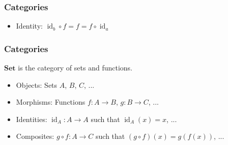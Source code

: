 \documentclass{beamer}
\DeclareMathOperator{\id}{id}
\newcommand{\idO}[1]{\natO{\id}{#1}}
\newcommand{\comp}{\ensuremath{\mathrel{\circ}}}
\newcommand{\catbf}[1]{\ensuremath{\mathbf{#1}}\xspace}
\newcommand{\set}{\catbf{Set}}
\newcommand{\nat}[1]{\ensuremath{#1}}
\newcommand{\natO}[2]{\ensuremath{\nat{#1}_{#2}}}
\begin{document}

\begin{frame}
  \frametitle{Categories}

  \begin{definition}[Category]
    \begin{itemize}
    \item
      Identity: $\idO{b} \comp f = f = f \comp \idO{a}$
    \end{itemize}
  \end{definition}
  \begin{center}
  \end{center}

\end{frame}


\begin{frame}[label={ex:set}]
  \frametitle{Categories}

  \begin{example}
    \set is the category of sets and functions.
    \begin{itemize}
    \item
      Objects: Sets $A$, $B$, $C$, ...
    \item
      Morphisms: Functions $f: A \to B$, $g: B \to C$, ...
    \item
      Identities: $\idO{A}: A \to A$ such that $\idO{A}(x) = x$, ...
    \item
      Composites: $g \comp f: A \to C$ such that $(g \comp f)(x) =
      g(f(x))$, ...
    \end{itemize}
  \end{example}
  \vfill\hfill\hyperlink{re:foundations}{\beamergotobutton{}}

\end{frame}
\end{document}
